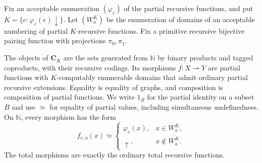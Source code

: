 \documentclass[letterpaper,10pt]{amsart}
\theoremstyle{plain}
\theoremstyle{definition}
\begin{document}
Fix an acceptable enumeration $(\varphi_e)$ of the partial recursive
functions, and put $K=\{e:\varphi_e(e)\downarrow\}$. Let $(W_a^K)$
be the enumeration of domains of an acceptable numbering of partial
$K$-recursive functions. Fix a primitive recursive bijective pairing
function with projections $\pi_0,\pi_1$.

The objects of $\mathbf C_K$ are the sets generated from $\mathbb N$
by binary products and tagged coproducts, with their recursive codings.
Its morphisms $f:X\rightharpoonup Y$ are partial functions with
$K$-computably enumerable domains that admit ordinary partial recursive
extensions. Equality is equality of graphs, and composition is composition
of partial functions. We write $1_B$ for the partial identity on a
subset $B$ and use $\simeq$ for equality of partial values, including
simultaneous undefinedness. On $\mathbb N$, every morphism has the form
\[
f_{e,a}(x)\simeq
\begin{cases}
\varphi_e(x),&x\in W_a^K,\\
\uparrow,&x\notin W_a^K.
\end{cases}
\]
The total morphisms are exactly the ordinary
total recursive functions.
\end{document}
